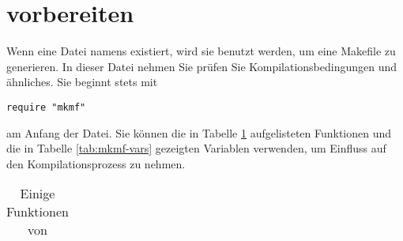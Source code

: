 \section{ vorbereiten}
\label{sec:extconf.rb}

Wenn eine Datei namens  existiert, wird sie benutzt
werden, um eine Makefile zu generieren. In dieser Datei nehmen Sie
prüfen Sie Kompilationsbedingungen und ähnliches. Sie beginnt stets
mit

\begin{lstlisting}
require "mkmf"
\end{lstlisting}

am Anfang der Datei. Sie können die in Tabelle \ref{tab:mkmf-funcs}
aufgelisteten Funktionen und die in Tabelle \ref{tab:mkmf-vars}
gezeigten Variablen verwenden, um Einfluss auf den Kompilationsprozess
zu nehmen.

\begin{table}
  \centering
  \begin{tabular}{ll}
    
  \end{tabular}
  \caption{Einige Funktionen von }
  \label{tab:mkmf-funcs}
\end{table}

